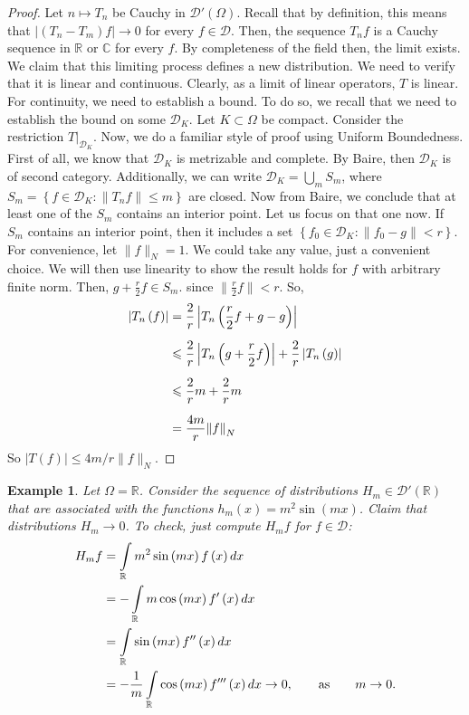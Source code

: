 \documentclass[letterpaper,twoside,11pt]{article}
\theoremstyle{mystyle}
\newtheorem*{ex}{Example}
\newcommand{\R}{{\mathbb R}}
\newcommand{\C}{{\mathbb C}}
\newcommand{\DD}{\mathcal D}
\newcommand{\cg}{\color{gray}}
\newcommand{\cbk}{\color{black}}
\begin{document}
\begin{proof}
  Let $n \mapsto T_n$ be Cauchy in $\DD'(\Omega)$. \cg Recall that by definition, this means that $|\left( T_n - T_m \right)f | \to 0$ for every $f \in \DD$. \cbk Then, the sequence $T_n f$ is a Cauchy sequence in $\R$ or $\C$ for every $f$. By completeness of the field then, the limit exists. We claim that this limiting process defines a new distribution. We need to verify that it is linear and continuous. Clearly, as a limit of linear operators, $T$ is linear. For continuity, we need to establish a bound. To do so, we recall that we need to establish the bound on some $\DD_K$. Let $K \subset \Omega$ be compact. Consider the restriction $T|_{\DD_K}$. Now, we do a familiar style of proof using Uniform Boundedness. First of all, we know that $\DD_K$ is metrizable and complete. By Baire, then $\DD_K$ is of second category. Additionally, we can write $\DD_K = \bigcup_mS_m$, where $S_m = \left\{ f \in \DD_K : \|T_nf\|\leq m \right\}$ are closed. Now from Baire, we conclude that at least one of the $S_m$ contains an interior point. Let us focus on that one now. If $S_m$ contains an interior point, then it includes a set $\left\{ f_0 \in \DD_K : \|f_0 - g\| < r \right\}$. 
  For convenience, let $\|f\|_N = 1$. \cg We could take any value, just a convenient choice.  We will then use linearity to show the result holds for $f$ with arbitrary finite norm. \cbk Then, $g + \frac{r}{2}f \in S_m$. \cg since $\|\frac{r}{2}f\| < r$. \cbk So, 
  \begin{align*}
    \left| {{T_n}\left( f \right)} \right| &= \frac{2}{r}\left| {{T_n}\left( {\frac{r}{2}f + g - g} \right)} \right| \hfill \\[.2cm]
     &\leqslant \frac{2}{r}\left| {{T_n}\left( {g + \frac{r}{2}f} \right)} \right| + \frac{2}{r}\left| {{T_n}\left( g \right)} \right| \hfill \\[.2cm]
     &\leqslant \frac{2}{r}m + \frac{2}{r}m \hfill \\[.2cm]
     &= \frac{{4m}}{r}{\left\| f \right\|_N} 
  \end{align*}
  So $|T(f)| \leq 4m/r \|f\|_N$.
\end{proof}
\begin{ex}
  Let $\Omega=\R$. Consider the sequence of distributions $H_m \in \DD'\left( \R \right)$ that are associated with the functions $h_m(x) = m^2\sin(mx)$. Claim that distributions $H_m \to 0$. To check, just compute $H_m f$ for $f \in \DD$:
  \begin{align*}
    {H_m}f &= \int\limits_\mathbb{R} {{m^2}\sin \left( {mx} \right)f\left( x \right)dx}  \hfill \\
     &=  - \int\limits_\mathbb{R} {m\cos \left( {mx} \right)f'\left( x \right)dx}  \hfill \\
     &= \int\limits_\mathbb{R} {\sin \left( {mx} \right)f''\left( x \right)dx}  \hfill \\
     &=  - \frac{1}{m}\int\limits_\mathbb{R} {\cos \left( {mx} \right)f'''\left( x \right)dx}  \to 0,\qquad \text{as}\qquad m \to 0.
  \end{align*}
\end{ex}
\end{document}
